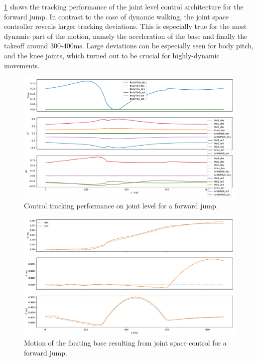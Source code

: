 \ref{fig:jumpForward_pybulletTracking} shows the tracking performance of the joint level control architecture for the forward jump. In contrast to the case of dynamic walking, the joint space controller reveals larger tracking deviations. This is especially true for the most dynamic part of the motion, namely the acceleration of the base and finally the takeoff around 300-400ms. Large deviations can be especially seen for body pitch, and the knee joints, which turned out to be crucial for highly-dynamic movements. 

\begin{figure}[h!]
\centering	
\includegraphics[width=1\textwidth]{fig/jumpForward/pybullet/pybulletTracking}
\caption{Control tracking performance on joint level for a forward jump.}
\label{fig:jumpForward_pybulletTracking}
\end{figure}


\begin{figure}[h!]
\centering	
\includegraphics[width=1\textwidth]{fig/jumpForward/pybullet/pybulletBase}
\caption{Motion of the floating base resulting from joint space control for a forward jump.}
\label{fig:jumpForward_pybulletBase}
\end{figure}

